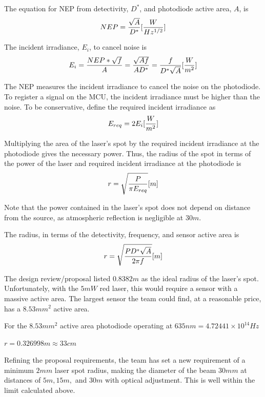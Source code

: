 \documentclass[letterpaper,10pt]{article}
\begin{document}
\begin{spacing}{1.15}
The equation for NEP from detectivity, $D^*$, and photodiode active area, $A$,  is 
\begin{equation} \large 
	NEP = \frac{\sqrt{A}}{D^*}  [\frac{W}{Hz^{1/2}}]
\end{equation}

The incident irradiance, $E_i$, to cancel noise is
\begin{equation} \large 
	E_i = \frac{NEP * \sqrt{f}}{A} = \frac{\sqrt{Af}}{AD^*} = \frac{f}{D^*\sqrt{A}} [\frac{W}{m^{2}}]
\end{equation}

The NEP measures the incident irradiance to cancel the noise on the photodiode. To register a signal on the MCU, the incident irradiance must be higher than the noise. To be conservative, define the required incident irradiance as 
\begin{equation} \large 
	E_{req} = 2E_i [\frac{W}{m^{2}}]
\end{equation}

Multiplying the area of the laser's spot by the required incident irradiance at the photodiode gives the necessary power. Thus, the radius of the spot in terms of the power of the laser and required incident irradiance at the photodiode is 
\begin{equation} \large 
	r = \sqrt{\frac{P}{\pi E_{req}}} [m]
\end{equation}

Note that the power contained in the laser's spot does not depend on distance from the source, as atmospheric reflection is negligible at $30 m$.

The radius, in terms of the detectivity, frequency, and sensor active area is
\begin{equation}\large 
	r = \sqrt{\frac{PD^*\sqrt{A}}{2 \pi f}} [m]
\end{equation}

The design review/proposal listed $0.8382 m$ as the ideal radius of the laser's spot. Unfortunately, with the $5mW$ red laser, this would require a sensor with a massive active area. The largest sensor the team could find, at a reasonable price, has a $8.53 mm^2$ active area. 

For the $8.53 mm^2$ active area photodiode operating at $635 nm = 4.72441 × 10^{14} Hz$ 
\begin{center}
	$r = 0.326998 m \approx 33 cm$
\end{center}

Refining the proposal requirements, the team has set a new requirement of a minimum $2 mm$ laser spot radius, making the diameter of the beam $30mm$ at distances of $5m, 15m,$ and $30m$ with optical adjustment. This is well within the limit calculated above. 






\end{spacing}
\end{document}
